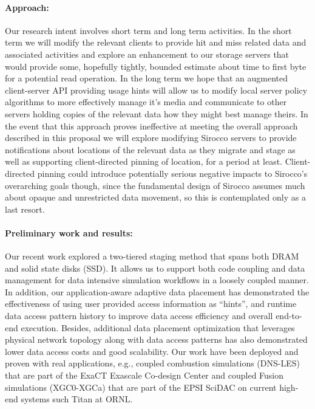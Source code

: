\paragraph{Approach:}
Our research intent involves short term and long term activities. In the short
term we will modify the relevant clients to provide hit and miss related data
and associated activities and explore an enhancement to our storage servers
that would provide some, hopefully tightly, bounded estimate about time to
first byte for a potential read operation. In the long term we hope that an
augmented client-server API providing usage hints will allow us to modify local
server policy algorithms to more effectively manage it's media and communicate
to other servers holding copies of the relevant data how they might best manage
theirs. In the event that this approach proves ineffective at meeting the
overall approach described in this proposal we will explore modifying Sirocco
servers to provide notifications about locations of the relevant data as they
migrate and stage as well as supporting client-directed pinning of location,
for a period at least. Client-directed pinning could introduce potentially
serious negative impacts to Sirocco's overarching goals though, since the
fundamental design of Sirocco assumes much about opaque and unrestricted data
movement, so this is contemplated only as a last resort.

\paragraph{Preliminary work and results:} Our recent work \cite{tongipdps15}
explored a two-tiered staging method that spans both DRAM and solid state
disks (SSD). It allows us to support both code coupling and data management
for data intensive simulation workflows in a loosely coupled manner. In
addition, our application-aware adaptive data placement has demonstrated the
effectiveness of using user provided access information as ``hints'', and
runtime data access pattern history to improve data access efficiency and
overall end-to-end execution. Besides, additional data placement
optimization \cite{qiansc15} that leverages physical network topology along
with data access patterns has also demonstrated lower data access costs and
good scalability. Our work have been deployed and proven with real
applications, e.g., coupled combustion simulations (DNS-LES) that are part
of the ExaCT Exascale Co-design Center and coupled Fusion simulations
(XGC0-XGCa) that are part of the EPSI SciDAC on current high-end systems
such Titan at ORNL.


